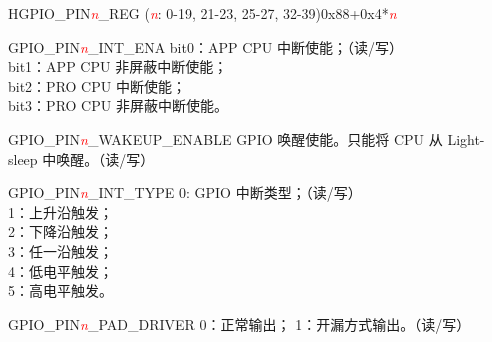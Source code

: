 \begin{register}{H}{GPIO\_PIN\textcolor{red}{\it{n}}\_REG (\textcolor{red}{\it{n}}: 0-19, 21-23, 25-27, 32-39)}{0x88+0x4*\textcolor{red}{\it{n}}}\label{regdesc:GPIOPINnREG}
%
%
%
%
%
%
%
%
\regnewline%
\begin{regdesc}\begin{reglist}
\item [GPIO\_PIN\textcolor{red}{\it{n}}\_INT\_ENA]bit0：APP CPU 中断使能；（读/写） \\bit1：APP CPU 非屏蔽中断使能； \\bit2：PRO CPU 中断使能；  \\bit3：PRO CPU 非屏蔽中断使能。 
\item [GPIO\_PIN\textcolor{red}{\it{n}}\_WAKEUP\_ENABLE]GPIO 唤醒使能。只能将 CPU 从 Light-sleep 中唤醒。（读/写）
\item [GPIO\_PIN\textcolor{red}{\it{n}}\_INT\_TYPE]0: GPIO 中断类型；（读/写） \\1：上升沿触发；\\2：下降沿触发；\\3：任一沿触发；\\4：低电平触发；\\5：高电平触发。
\item [GPIO\_PIN\textcolor{red}{\it{n}}\_PAD\_DRIVER]0：正常输出； 1：开漏方式输出。（读/写）
\end{reglist}\end{regdesc}
\end{register}


